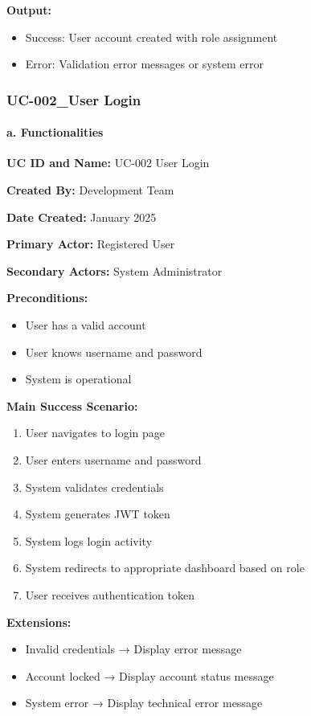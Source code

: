 \documentclass[12pt,a4paper]{article}
\begin{document}
\textbf{Output:}
\begin{itemize}
    \item Success: User account created with role assignment
    \item Error: Validation error messages or system error
\end{itemize}

\subsubsection{UC-002\_User Login}

\paragraph{a. Functionalities}

\textbf{UC ID and Name:} UC-002 User Login

\textbf{Created By:} Development Team

\textbf{Date Created:} January 2025

\textbf{Primary Actor:} Registered User

\textbf{Secondary Actors:} System Administrator

\textbf{Preconditions:}
\begin{itemize}
    \item User has a valid account
    \item User knows username and password
    \item System is operational
\end{itemize}

\textbf{Main Success Scenario:}
\begin{enumerate}
    \item User navigates to login page
    \item User enters username and password
    \item System validates credentials
    \item System generates JWT token
    \item System logs login activity
    \item System redirects to appropriate dashboard based on role
    \item User receives authentication token
\end{enumerate}

\textbf{Extensions:}
\begin{itemize}
    \item Invalid credentials → Display error message
    \item Account locked → Display account status message
    \item System error → Display technical error message
\end{itemize}
\end{document}
